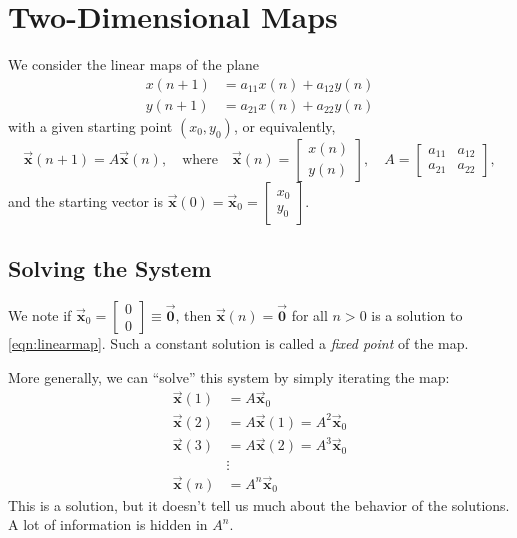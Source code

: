 \documentclass[reqno]{immbook}
\newcommand{\BX}{\vec{\textbf{x}}}
\newcommand{\BZero}{\vec{\textbf{0}}}  %
\newcommand{\ds}{\displaystyle}
\numberwithin{equation}{chapter}
\numberwithin{question}{section}
\numberwithin{theorem}{chapter}
\numberwithin{figure}{chapter}
\theoremstyle{definition}
\begin{document}
\newpage
\section{Two-Dimensional Maps}

We consider the linear maps of the plane
\begin{equation}
\begin{split}
  x(n+1) & = a_{11}x(n) + a_{12}y(n) \\
  y(n+1) & = a_{21}x(n) + a_{22}y(n)
\end{split}
\end{equation}
with a given starting point $(x_0,y_0)$,
or equivalently,
\begin{equation}
  \BX(n+1) = A\BX(n), \quad \textrm{where} \quad
     \BX(n) = \begin{bmatrix} x(n) \\ y(n) \end{bmatrix},
     \quad
     A = \begin{bmatrix} a_{11} & a_{12} \\ a_{21} & a_{22} \end{bmatrix},
\label{eqn:linearmap}
\end{equation}
and the starting vector is
$\ds \BX(0) = \BX_0 = \begin{bmatrix} x_0 \\ y_0 \end{bmatrix}$.
%
%
\subsection*{Solving the System}
We note if $\BX_0 = \begin{bmatrix}0 \\ 0\end{bmatrix} \equiv \BZero$, then $\BX(n) = \BZero$ for all $n>0$ is a solution to \eqref{eqn:linearmap}.
Such a constant solution is called a \emph{fixed point}
of the map.

More generally, we can ``solve'' this system by simply iterating the
map:
\begin{equation}
\begin{split}
  \BX(1) & = A\BX_0 \\
  \BX(2) & = A\BX(1) = A^2\BX_0 \\
  \BX(3) & = A\BX(2) = A^3\BX_0 \\
        & \vdots \\
  \BX(n) & = A^n\BX_0
\end{split}
\end{equation}
This is a solution, but it doesn't tell us much about the
behavior of the solutions.  A lot of information is hidden
in $A^n$.
\end{document}
